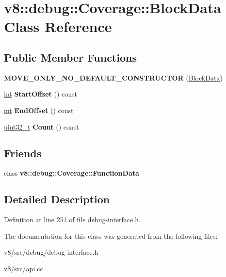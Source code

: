 \hypertarget{classv8_1_1debug_1_1Coverage_1_1BlockData}{}\section{v8\+:\+:debug\+:\+:Coverage\+:\+:Block\+Data Class Reference}
\label{classv8_1_1debug_1_1Coverage_1_1BlockData}
\subsection*{Public Member Functions}
\begin{DoxyCompactItemize}
\item 
\mbox{\label{classv8_1_1debug_1_1Coverage_1_1BlockData_a18c3db412a8800744eb67648c7dc0d6b}} 
{\bfseries M\+O\+V\+E\+\_\+\+O\+N\+L\+Y\+\_\+\+N\+O\+\_\+\+D\+E\+F\+A\+U\+L\+T\+\_\+\+C\+O\+N\+S\+T\+R\+U\+C\+T\+OR} (\mbox{\hyperlink{classv8_1_1debug_1_1Coverage_1_1BlockData}{Block\+Data}})
\item 
\mbox{\label{classv8_1_1debug_1_1Coverage_1_1BlockData_a9d6f72a8ba4333c4673132c4302b6b7f}} 
\mbox{\hyperlink{classint}{int}} {\bfseries Start\+Offset} () const
\item 
\mbox{\label{classv8_1_1debug_1_1Coverage_1_1BlockData_a04848ad04c7dc88ef41d48cf0b476837}} 
\mbox{\hyperlink{classint}{int}} {\bfseries End\+Offset} () const
\item 
\mbox{\label{classv8_1_1debug_1_1Coverage_1_1BlockData_a6e6381666f4827f841b854a0d89b6fd4}} 
\mbox{\hyperlink{classuint32__t}{uint32\+\_\+t}} {\bfseries Count} () const
\end{DoxyCompactItemize}
\subsection*{Friends}
\begin{DoxyCompactItemize}
\item 
\mbox{\label{classv8_1_1debug_1_1Coverage_1_1BlockData_a57be45c54340be14b262caf2cb3b16fb}} 
class {\bfseries v8\+::debug\+::\+Coverage\+::\+Function\+Data}
\end{DoxyCompactItemize}


\subsection{Detailed Description}


Definition at line 251 of file debug-\/interface.\+h.



The documentation for this class was generated from the following files\+:\begin{DoxyCompactItemize}
\item 
v8/src/debug/debug-\/interface.\+h\item 
v8/src/api.\+cc\end{DoxyCompactItemize}
